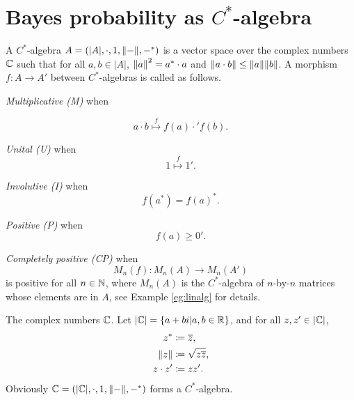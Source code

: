 \section{Bayes probability as $C^*$-algebra}

\begin{Def}A $C^*$-algebra $A = (|A|, \cdot, 1, \norm{-}, -^*)$ is a vector space over the complex numbers $\Bbb{C}$  such that for all $a,b \in |A|$, $\norm{a}^2 = a^* \cdot a$ and $\norm{a \cdot b} \leq \norm{a}\norm{b}$. A morphism $f : A \to A' $ between $C^*$-algebras is called as follows.

\noindent
\textit{Multiplicative (M)} when 

\begin{equation}
a\cdot b  \stackrel{f}{\longmapsto} f(a) \cdot' f(b). \label{eq:starM}
\end{equation}

\noindent
\textit{Unital (U)} when
\begin{equation}
 1 \stackrel{f}{\longmapsto} 1'. \label{eq:starU}
 \end{equation}

\noindent
\textit{Involutive (I)} when
\begin{equation}
f(a^*) = f(a)^*. \label{eq:starI}
\end{equation}

\noindent
\textit{Positive (P)} when
\begin{equation}
f(a) \geq  0'. \label{starP}
\end{equation}

\noindent
\textit{Completely positive (CP)} when
\begin{equation}
M_n(f):M_n(A) \to M_n(A') \label{eq:starCP}
\end{equation}
is positive for all $n \in \Bbb{N}$, where $M_n(A)$ is the $C^*$-algebra of $n$-by-$n$ matrices whose elements are in $A$, see Example \ref{eg:linalg} for details.
\end{Def}

\begin{Eg}\label{eg:Cs} The complex numbers $\Bbb{C}$. Let $|\Bbb{C}| = \{a+bi | a,b \in \Bbb{R} \} $, and for all $z,z' \in |\Bbb{C}|$,
\begin{alignat*}{2}
z^*         \coloneqq{}& \overline{z}, \\
\norm{z}    \coloneqq{}& \sqrt{z \overline{z}}, \\
z \cdot z'  \coloneqq{}& zz'.
\end{alignat*}
Obviously $\Bbb{C} = (|\Bbb{C}|, \cdot, 1, \norm{-}, -^*)$ forms a $C^*$-algebra.
\end{Eg}

